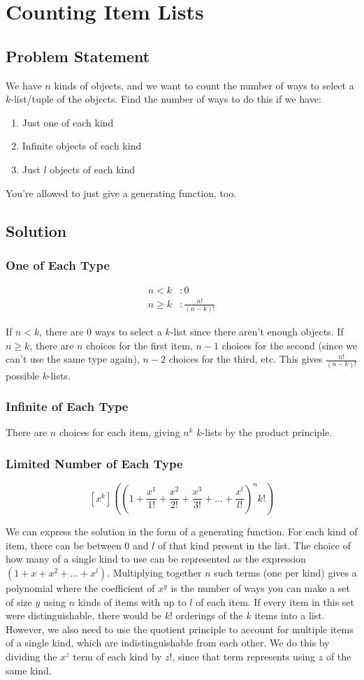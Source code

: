 \documentclass[12pt]{article}
\newcommand{\ProblemStatement}[1]{
\subsection*{Problem Statement}
#1
\subsection*{Solution}
}
\begin{document}
\section{Counting Item Lists}
\ProblemStatement{
We have $n$ kinds of objects, and we want to count the number of ways to select a $k$-list/tuple of the objects. Find the number of ways to do this if we have:
\begin{enumerate}
\item Just one of each kind
\item Infinite objects of each kind
\item Just $l$ objects of each kind    
\end{enumerate}
You're allowed to just give a generating function, too.
}

\subsubsection*{One of Each Type}
\begin{align*}
    n < k &: 0\\
    n \ge k &: \frac{n!}{(n-k)!}
\end{align*}

If $n < k$, there are 0 ways to select a $k$-list since there aren't enough objects. If $n \ge k$, there are $n$ choices for the first item, $n-1$ choices for the second (since we can't use the same type again), $n-2$ choices for the third, etc. This gives $\frac{n!}{(n-k)!}$ possible $k$-lists.

\subsubsection*{Infinite of Each Type}
There are $n$ choices for each item, giving $n^k$ $k$-lists by the product principle.

\subsubsection*{Limited Number of Each Type}

\[
  [x^k]\left(\left(1 + \frac{x^1}{1!} + \frac{x^2}{2!} + \frac{x^3}{3!} + \ldots + \frac{x^l}{l!}\right)^nk!\right)
\]


We can express the solution in the form of a generating function. For each kind of item, there can be between 0 and $l$ of that kind present in the list. The choice of how many of a single kind to use can be represented as the expression $(1 + x + x^2 + \ldots + x^l)$. Multiplying together $n$ such terms (one per kind) gives a polynomial where the coefficient of $x^y$ is the number of ways you can make a set of size $y$ using $n$ kinds of items with up to $l$ of each item. If every item in this set were distinguishable, there would be $k!$ orderings of the $k$ items into a list. However, we also need to use the quotient principle to account for multiple items of a single kind, which are indistinguishable from each other. We do this by dividing the $x^z$ term of each kind by $z!$, since that term represents using $z$ of the same kind.
\end{document}
